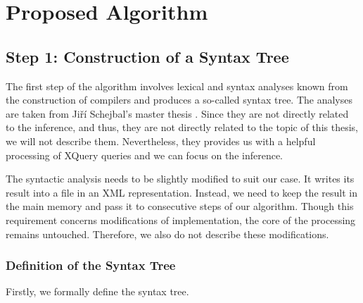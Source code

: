 \chapter{Proposed Algorithm}

\section{Step 1: Construction of a Syntax Tree}
The first step of the algorithm involves lexical and syntax analyses known from the construction of compilers and produces a so-called syntax tree. The analyses are taken from Ji\v r\'{i} Schejbal's master thesis . Since they are not directly related to the inference, and thus, they are not directly related to the topic of this thesis, we will not describe them. Nevertheless, they provides us with a helpful processing of XQuery queries and we can focus on the inference.

The syntactic analysis needs to be slightly modified to suit our case. It writes its result into a file in an XML representation. Instead, we need to keep the result in the main memory and pass it to consecutive steps of our algorithm. Though this requirement concerns modifications of implementation, the core of the processing remains untouched. Therefore, we also do not describe these modifications.

\subsection{Definition of the Syntax Tree}
Firstly, we formally define the syntax tree.

